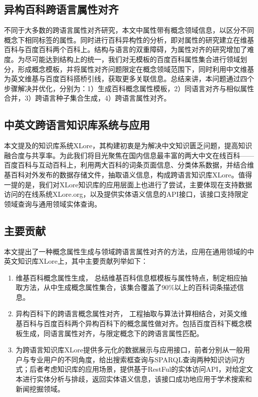 \subsection{异构百科跨语言属性对齐}
不同于大多数的跨语言属性对齐研究，本文中属性带有概念领域信息，以区分不同概念下相同标签的属性。同时进行百科异构性的分析，即对属性的研究建立在维基百科与百度百科两个百科上。结构与语言的双重障碍，为属性对齐的研究增加了难度。为尽可能达到结构上的统一，我们对无模板的百度百科属性集合进行领域划分，形成概念模板，并将属性对齐问题限定在概念领域范围下，同时利用中文维基为英文维基与百度百科搭桥引线，获取更多关联信息。总结来讲，本问题通过四个步骤解决并优化，分别为：1）生成百科概念属性模板，2）同语言对齐与相似属性合并，3）跨语言种子集合生成，4）跨语言属性对齐。

\subsection{中英文跨语言知识库系统与应用}
本文提及的知识库系统XLore，其构建初衷是为解决中文知识匮乏问题，提高知识融合度与共享率。为此我们将目光聚焦在国内信息最丰富的两大中文在线百科——百度百科与互动百科上，利用两大百科的词条页面信息、分类体系数据，并结合维基百科对外发布的数据存储文件，抽取语义信息，构成跨语言知识库XLore。值得一提的是，我们对XLore知识库的应用层面上也进行了尝试，主要体现在支持数据访问的在线系统XLore.org，以及提供实体语义信息的API接口，该接口支持限定领域查询与通用领域实体查询。

\subsection{主要贡献}
本文提出了一种概念属性生成与领域跨语言属性对齐的方法，应用在通用领域的中英文知识库XLore上，其中主要贡献列举如下：
\begin{enumerate}[1)]
\item {\heiti 维基百科概念属性生成，} 总结维基百科信息框模板与属性特点，制定相应抽取方法，从中生成概念属性集合，该集合覆盖了90\%以上的百科词条描述信息。
\item {\heiti 异构百科下的跨语言概念属性对齐，} 工程抽取与算法计算相结合，对英文维基百科与百度百科两个异构百科下的概念属性做对齐。包括百度百科下概念模板生成，同语言属性对齐，与限定概念下的跨语言属性匹配。
\item {\heiti 为跨语言知识库XLore提供多元化的数据展示与应用接口，}前者分别从一般用户与专业用户的不同角度，给出搜索框查询与SPARQL查询两种知识访问方式；后者考虑知识库的应用场景，提供基于RestFul的实体访问API，对给定文本进行实体分析与排歧，返回实体语义信息，该接口成功地应用于学术搜索和新闻挖掘领域。
\end{enumerate}

